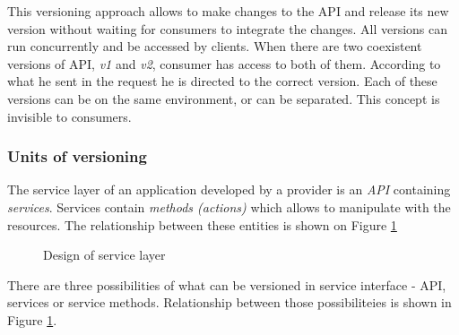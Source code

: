 This versioning approach allows to make changes to the API and release its new version without waiting for consumers to integrate the changes. All versions can run concurrently and be accessed by clients. When there are two coexistent versions of API, \emph{v1} and \emph{v2}, consumer has access to both of them. According to what he sent in the request he is directed to the correct version. Each of these versions can be on the same environment, or can be separated. This concept is invisible to  consumers.



\subsubsection{Units of versioning}
\label{sec:units}

The service layer of an application developed by a provider is an \emph{API} containing \emph{services}. Services contain \emph{methods (actions)} which allows to manipulate with the resources. The relationship between these entities is shown on Figure \ref{fig:service-layer-design}

\begin{figure}[htp] 
\caption{Design of service layer}
\label{fig:service-layer-design}
\end{figure} 

There are three possibilities of what can be versioned in service interface - API, services or service methods. Relationship between those possibiliteies is shown in Figure \ref{fig:service-layer-design}. 

